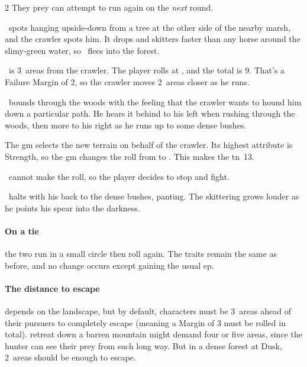 \begin{multicols}{2}
They prey can attempt to run again on the \emph{next} \gls{round}.

\begin{exampletext}
  \composeHumanName\ spots  hanging upside-down from a tree at the other side of the nearby marsh, and the \gls{crawler} spots him.
  It drops and skitters faster than any horse around the slimy-green water, so \currentName\ flees into the forest.

  {\sffamily \currentName\ is 3~\glspl{area} from the \gls{crawler}.
  The player rolls at \tn[11], and the total is 9.
  That's a Failure Margin of 2, so the \gls{crawler} moves 2~\glspl{area} closer as he runs. }

  \currentName\ bounds through the woods with the feeling that the \gls{crawler} wants to hound him down a particular path.
  He hears it behind to his left when rushing through the woods, then more to his right as he runs up to some dense bushes.

  {\sffamily The \gls{gm} selects the new terrain on behalf of the \gls{crawler}.
  Its highest \gls{attribute} is Strength, so the \gls{gm} changes the roll from  to .
  This makes the \gls{tn}~13.

  \currentName\ cannot make the roll, so the player decides to stop and fight.}

  \currentName\ halts with his back to the dense bushes, panting.
  The skittering grows louder as he points his spear into the darkness.
\end{exampletext}

\paragraph{On a tie}
the two run in a small circle then roll again.
The \glspl{trait} remain the same as before, and no change occurs except gaining the usual \gls{ep}.

\paragraph{The distance to escape}
depends on the landscape, but by default, characters must be 3~\glspl{area} ahead of their pursuers to completely escape (meaning a Margin of 3 must be rolled in total).
\Gls{retreat} down a barren mountain might demand four or five \glspl{area}, since the hunter can see their prey from such long way.
But in a dense forest at Dusk, 2~\glspl{area} should be enough to escape.


\end{multicols}
